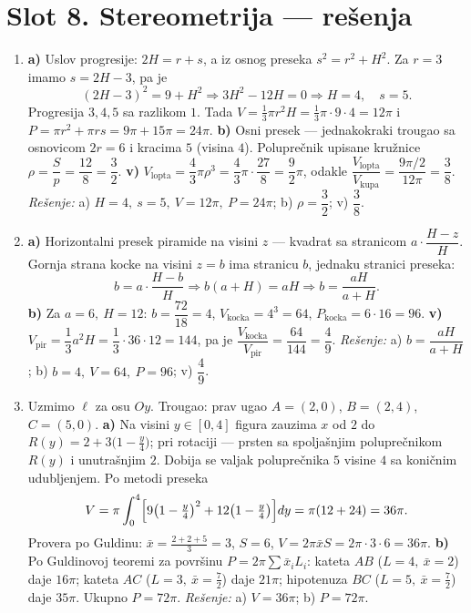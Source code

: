 \section*{Slot 8. Stereometrija — rešenja}
\begin{enumerate}[label=\arabic*.]
\item \textbf{a)} Uslov progresije: $2H=r+s$, a iz osnog preseka $s^2=r^2+H^2$. Za $r=3$ imamo $s=2H-3$, pa je
\[(2H-3)^2=9+H^2\Rightarrow 3H^2-12H=0\Rightarrow H=4,\quad s=5.\]
Progresija $3,4,5$ sa razlikom $1$. Tada $V=\frac{1}{3}\pi r^2 H=\frac{1}{3}\pi\cdot 9\cdot 4=12\pi$ i $P=\pi r^2+\pi r s=9\pi+15\pi=24\pi$.
\textbf{b)} Osni presek — jednakokraki trougao sa osnovicom $2r=6$ i kracima $5$ (visina $4$). Poluprečnik upisane kružnice $\rho=\dfrac{S}{p}=\dfrac{12}{8}=\dfrac{3}{2}$.
\textbf{v)} $V_{\text{lopta}}=\dfrac{4}{3}\pi\rho^3=\dfrac{4}{3}\pi\cdot\dfrac{27}{8}=\dfrac{9}{2}\pi$, odakle $\dfrac{V_{\text{lopta}}}{V_{\text{kupa}}}=\dfrac{9\pi/2}{12\pi}=\dfrac{3}{8}$.
\emph{Rešenje:} a) $H=4,\ s=5,\ V=12\pi,\ P=24\pi$; b) $\rho=\dfrac32$; v) $\dfrac38$.

\item \textbf{a)} Horizontalni presek piramide na visini $z$ — kvadrat sa stranicom $a\cdot\dfrac{H-z}{H}$. Gornja strana kocke na visini $z=b$ ima stranicu $b$, jednaku stranici preseka:
\[b=a\cdot\frac{H-b}{H}\Rightarrow b(a+H)=aH\Rightarrow b=\frac{aH}{a+H}.\]
\textbf{b)} Za $a=6,\ H=12$: $b=\dfrac{72}{18}=4$, $V_{\text{kocka}}=4^3=64$, $P_{\text{kocka}}=6\cdot 16=96$.
\textbf{v)} $V_{\text{pir}}=\dfrac{1}{3}a^2H=\dfrac{1}{3}\cdot 36\cdot 12=144$, pa je $\dfrac{V_{\text{kocka}}}{V_{\text{pir}}}=\dfrac{64}{144}=\dfrac{4}{9}$.
\emph{Rešenje:} a) $b=\dfrac{aH}{a+H}$; b) $b=4,\ V=64,\ P=96$; v) $\dfrac49$.

\item Uzmimo $\ell$ za osu $Oy$. Trougao: prav ugao $A=(2,0)$, $B=(2,4)$, $C=(5,0)$.
\textbf{a)} Na visini $y\in[0,4]$ figura zauzima $x$ od $2$ do $R(y)=2+3\bigl(1-\tfrac{y}{4}\bigr)$; pri rotaciji — prsten sa spoljašnjim poluprečnikom $R(y)$ i unutrašnjim $2$. Dobija se valjak poluprečnika $5$ visine $4$ sa koničnim udubljenjem. Po metodi preseka
\[V=\pi\int_0^4\Bigl[9\bigl(1-\tfrac{y}{4}\bigr)^2+12\bigl(1-\tfrac{y}{4}\bigr)\Bigr]dy=\pi(12+24)=36\pi.\]
Provera po Guldinu: $\bar x=\tfrac{2+2+5}{3}=3$, $S=6$, $V=2\pi\bar x S=2\pi\cdot3\cdot6=36\pi$.
\textbf{b)} Po Guldinovoj teoremi za površinu $P=2\pi\sum\bar x_i L_i$: kateta $AB$ ($L=4,\ \bar x=2$) daje $16\pi$; kateta $AC$ ($L=3,\ \bar x=\tfrac72$) daje $21\pi$; hipotenuza $BC$ ($L=5,\ \bar x=\tfrac72$) daje $35\pi$. Ukupno $P=72\pi$.
\emph{Rešenje:} a) $V=36\pi$; b) $P=72\pi$.


\end{enumerate}
